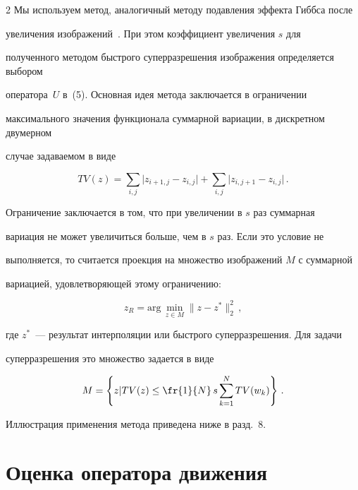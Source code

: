 \begin{multicols}{2}
     Мы используем метод, аналогичный методу подавления эффекта Гиббса после


увеличения изображений~\cite{19nas}. При этом коэффициент увеличения $s$ для


полученного методом быстрого суперразрешения изображения определяется выбором


оператора~$U$ в~(5). Основная идея метода заключается в ограничении


максимального значения функционала суммарной вариации, в дискретном двумерном


случае задаваемом в виде


     $$


     TV(z) = \sum\limits_{i,j} \vert  z_{i+1,j}-z_{i,j} \vert +


\sum\limits_{i,j} \vert z_{i,j+1}- z_{i,j}\vert\,.


     $$





     Ограничение заключается в том, что при увеличении в $s$ раз суммарная


вариация не может увеличиться больше, чем в $s$ раз. Если это условие не


выполняется, то считается проекция на множество изображений $M$ с суммарной


вариацией, удовлетворяющей этому ограничению:


     $$


z_R =\mathrm{arg}\,\underset{z\in M}{\min}\parallel z-z^*\parallel_2^2\,,


     $$


где $z^*$~--- результат интерполяции или быстрого суперразрешения. Для задачи


суперразрешения это множество задается в виде


$$


M = \left \{ z\vert TV(z)\leq \fr{1}{N}\, s\sum\limits_{k=1}^N TV(w_k)\right \}\,.


$$





     Иллюстрация применения метода приведена ниже в разд.~8.





     \section{Оценка оператора движения}






\end{multicols}
